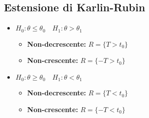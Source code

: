 \documentclass[a4paper,notitlepage]{report}%
\begin{document}
\begin{multicols*}{2}
    \subsection*{Estensione di Karlin-Rubin}
    \begin{itemize}
        \item $H_0: \theta \leq \theta_0 \quad H_1: \theta > \theta_1$
            \begin{itemize}
                \item \textbf{Non-decrescente:} $R=\{T > t_0\}$
                \item \textbf{Non-crescente:} $R=\{-T > t_0\}$
            \end{itemize}
        \item $H_0: \theta \geq \theta_0 \quad H_1: \theta < \theta_1$
        \begin{itemize}
            \item \textbf{Non-decrescente:} $R=\{T < t_0\}$
            \item \textbf{Non-crescente:} $R=\{-T < t_0\}$
        \end{itemize}
    \end{itemize}














\end{multicols*}
\end{document}
